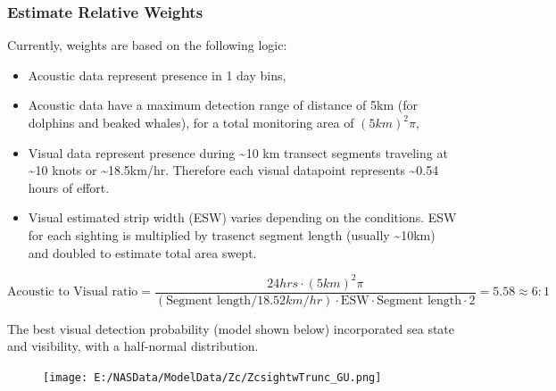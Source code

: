 \documentclass[11pt,]{article}
\newenvironment{Shaded}{\begin{snugshade}}{\end{snugshade}}
\newcommand{\KeywordTok}[1]{\textcolor[rgb]{0.13,0.29,0.53}{\textbf{{#1}}}}
\newcommand{\CharTok}[1]{\textcolor[rgb]{0.31,0.60,0.02}{{#1}}}
\newcommand{\StringTok}[1]{\textcolor[rgb]{0.31,0.60,0.02}{{#1}}}
\newcommand{\NormalTok}[1]{{#1}}
\begin{document}
\subsubsection{Estimate Relative
Weights}\label{estimate-relative-weights}

Currently, weights are based on the following logic:

\begin{itemize}
\item
  Acoustic data represent presence in 1 day bins,
\item
  Acoustic data have a maximum detection range of distance of 5km (for
  dolphins and beaked whales), for a total monitoring area of
  \((5 km)^{2} \pi\),
\item
  Visual data represent presence during \textasciitilde{}10 km transect
  segments traveling at \textasciitilde{}10 knots or
  \textasciitilde{}18.5km/hr. Therefore each visual datapoint represents
  \textasciitilde{}0.54 hours of effort.
\item
  Visual estimated strip width (ESW) varies depending on the conditions.
  ESW for each sighting is multiplied by trasenct segment length
  (usually \textasciitilde{}10km) and doubled to estimate total area
  swept.
\end{itemize}

\[\text{Acoustic to Visual ratio} = \frac{24 hrs \cdot (5 km)^{2} \pi}{(\text{Segment length}/18.52 km/hr) \cdot \text{ESW} \cdot \text{Segment length} \cdot 2} = 5.58 \approx 6 : 1
\]

The best visual detection probability (model shown below) incorporated
sea state and visibility, with a half-normal distribution.

\begin{figure}[htbp]
\centering
\texttt{[image: E:/NASData/ModelData/Zc/ZcsightwTrunc\_GU.png]}
\caption{}
\end{figure}

\begin{Shaded}
\end{Shaded}
\end{document}

